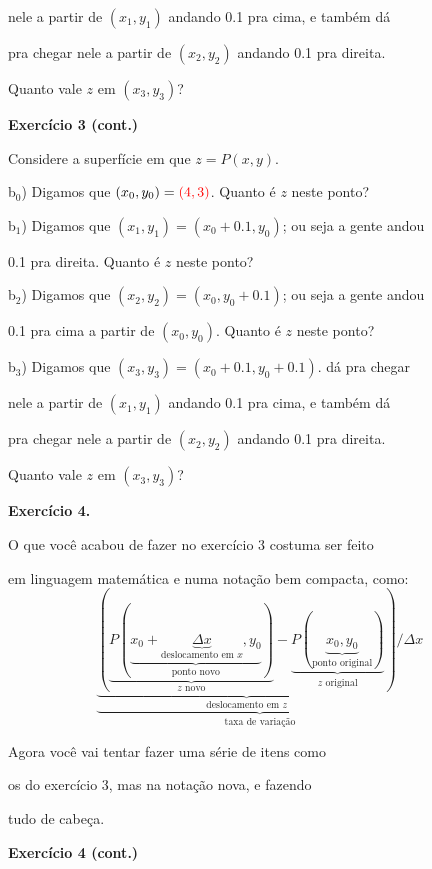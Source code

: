 \documentclass[oneside,12pt]{article}
\begin{document}
nele a partir de $(x_1,y_1)$ andando 0.1 pra cima, e também dá

pra chegar nele a partir de $(x_2,y_2)$ andando 0.1 pra direita.

Quanto vale $z$ em $(x_3,y_3)$?


\newpage

{\bf Exercício 3 (cont.)}

\msk

Considere a superfície em que $z=P(x,y)$.

\msk

\def\z#1{${}_#1$}

b\z0) Digamos que $(x_0,y_0)=\ColorRed{(4,3)}$. Quanto é $z$ neste ponto?

\msk

b\z1) Digamos que $(x_1,y_1) = (x_0+0.1,y_0)$; ou seja a gente andou

0.1 pra direita. Quanto é $z$ neste ponto?

\msk

b\z2) Digamos que $(x_2,y_2) = (x_0,y_0+0.1)$; ou seja a gente andou

0.1 pra cima a partir de $(x_0,y_0)$. Quanto é $z$ neste ponto?

\msk

b\z3) Digamos que $(x_3,y_3) = (x_0+0.1,y_0+0.1)$. dá pra chegar

nele a partir de $(x_1,y_1)$ andando 0.1 pra cima, e também dá

pra chegar nele a partir de $(x_2,y_2)$ andando 0.1 pra direita.

Quanto vale $z$ em $(x_3,y_3)$?


\newpage

{\bf Exercício 4.}

O que você acabou de fazer no exercício 3 costuma ser feito

em linguagem matemática e numa notação bem compacta, como:
%
\def\und#1#2{\underbrace{#1}_{\text{#2}}}
%
$$\und{
    \und{
    (\und{P(\und{x_0+\und{Δx}{deslocamento em $x$},y_0}{ponto novo})}{$z$ novo} -
     \und{P(\und{x_0,y_0}{ponto original})}{$z$ original})
    }{deslocamento em $z$}
    / Δx
   }{taxa de variação}
$$

Agora você vai tentar fazer uma série de itens como

os do exercício 3, mas na notação nova, e fazendo

tudo de cabeça.

\newpage

{\bf Exercício 4 (cont.)}
\end{document}
